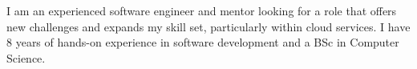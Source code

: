 \documentclass[8pt]{developercv} %
\begin{document}

\begin{minipage}[t]{0.4\textwidth} %
	\vspace{-\baselineskip} %
	\raggedright
	I am an experienced software engineer and mentor looking for a role that offers new challenges and expands my skill set, particularly within cloud services. I have 8 years of hands-on experience in software development and a BSc in Computer Science.
\end{minipage}
\hfill %
\begin{minipage}[t]{0.25\textwidth} %
	\vspace{-\baselineskip} %
	\begin{barchart}{0}
	\end{barchart}
\end{minipage}
\hfill %
\begin{minipage}[t]{0.3\textwidth} %
	\vspace{-\baselineskip} %
	\begin{barchart}{5}
	\end{barchart}
\end{minipage}



\end{document}
